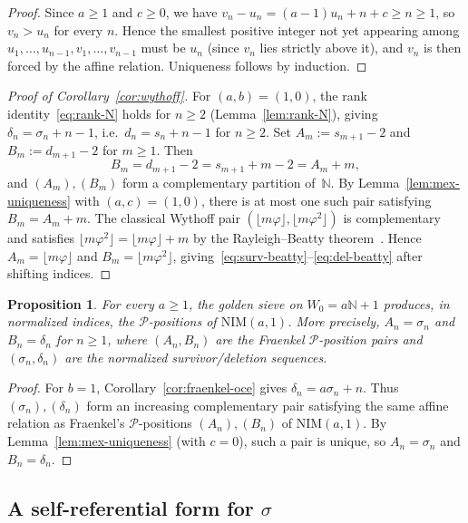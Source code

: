 \documentclass[11pt]{article}
\numberwithin{equation}{section}
\theoremstyle{plain}
\newtheorem{proposition}[theorem]{Proposition}
\theoremstyle{definition}
\theoremstyle{remark}
\newcommand{\N}{\mathbb{N}}
\begin{document}
\begin{proof}
Since $a\ge1$ and $c\ge0$, we have $v_n - u_n = (a-1)u_n+n+c \ge n \ge 1$,
so $v_n > u_n$ for every $n$.  Hence the smallest positive integer not yet
appearing among $u_1,\dots,u_{n-1},v_1,\dots,v_{n-1}$ must be $u_n$ (since
$v_n$ lies strictly above it), and $v_n$ is then forced by the affine relation.
Uniqueness follows by induction.
\end{proof}

\begin{proof}[Proof of Corollary~\ref{cor:wythoff}]
For $(a,b)=(1,0)$, the rank identity~\eqref{eq:rank-N} holds for $n\ge2$
(Lemma~\ref{lem:rank-N}), giving $\delta_n = \sigma_n + n - 1$,
i.e.\ $d_n = s_n + n - 1$ for $n\ge2$.
Set $A_m := s_{m+1}-2$ and $B_m := d_{m+1}-2$ for $m\ge1$.  Then
\[
  B_m = d_{m+1}-2 = s_{m+1}+m-2 = A_m+m,
\]
and $(A_m),(B_m)$ form a complementary partition of~$\N$.
By Lemma~\ref{lem:mex-uniqueness} with $(a,c)=(1,0)$, there is at most one
such pair satisfying $B_m=A_m+m$.
The classical Wythoff pair $(\lfloor m\varphi\rfloor,\lfloor m\varphi^2\rfloor)$
is complementary and satisfies $\lfloor m\varphi^2\rfloor=\lfloor m\varphi\rfloor+m$
by the Rayleigh--Beatty theorem~\cite{Beatty1926,Rayleigh1894}.
Hence $A_m=\lfloor m\varphi\rfloor$ and $B_m=\lfloor m\varphi^2\rfloor$,
giving~\eqref{eq:surv-beatty}--\eqref{eq:del-beatty} after shifting indices.
\end{proof}

\begin{proposition}%
\label{prop:P-positions}
For every $a\ge1$, the golden sieve on $W_0=a\N+1$ produces, in
normalized indices, the $\mathcal{P}$-positions of $\mathrm{NIM}(a,1)$.
More precisely, $A_n=\sigma_n$ and $B_n=\delta_n$ for $n\ge1$, where
$(A_n,B_n)$ are the Fraenkel $\mathcal{P}$-position pairs and
$(\sigma_n,\delta_n)$ are the normalized survivor/deletion sequences.
\end{proposition}

\begin{proof}
For $b=1$, Corollary~\ref{cor:fraenkel-oce} gives $\delta_n=a\sigma_n+n$.
Thus $(\sigma_n),(\delta_n)$ form an increasing complementary pair satisfying
the same affine relation as Fraenkel's $\mathcal{P}$-positions $(A_n),(B_n)$
of $\mathrm{NIM}(a,1)$.  By Lemma~\ref{lem:mex-uniqueness} (with $c=0$),
such a pair is unique, so $A_n=\sigma_n$ and $B_n=\delta_n$.
\end{proof}

\subsection{A self-referential form for \texorpdfstring{$\sigma$}{sigma}}
\end{document}
